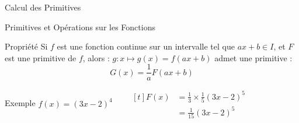\documentclass{cours}
\begin{document}
\begin{Gpartie}{Calcul des Primitives}
\begin{Spartie}{Primitives et Opérations sur les Fonctions}
\begin{SSpartie}{Propriété}
                Si $f$ est une fonction continue sur un intervalle tel que $ax+b\in I$, et $F$ est une primitive de $f$, alors : $g:x\mapsto g(x)=f(ax+b)$ admet une primitive :
                \[G(x)=\frac{1}{a}F(ax+b)\]
                \begin{SSSpartie}{Exemple} 
                    $f(x)=(3x-2)^4\qquad
                    \begin{aligned}[t]
                        F(x)&=\tfrac{1}{3}\times\tfrac{1}{5}(3x-2)^5 \\
                        &=\tfrac{1}{15}(3x-2)^5
                    \end{aligned}$
                \end{SSSpartie}
            \end{SSpartie}
        \end{Spartie}
    \end{Gpartie}
\end{document}
